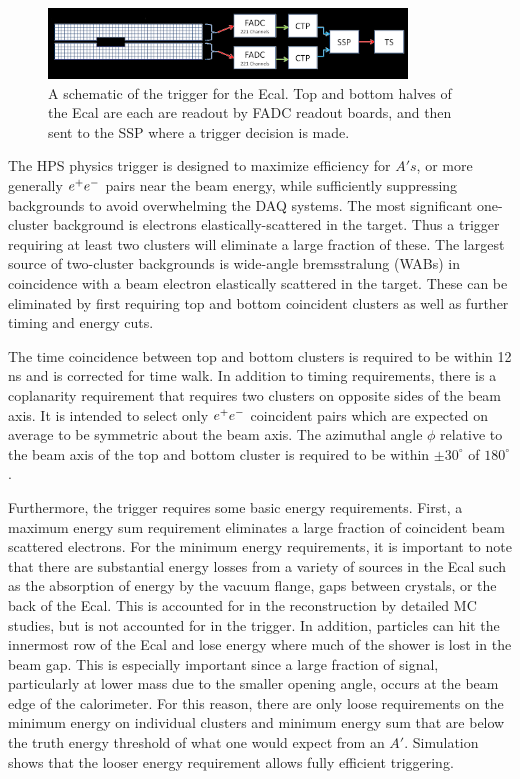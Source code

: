 \begin{figure}
    \centering
    \includegraphics[width=0.85\textwidth]{figs/detector/ecal_trigger.png}
    \caption{A schematic of the trigger for the Ecal. Top and bottom halves of the Ecal are each are readout by FADC readout boards, and then sent to the SSP where a trigger decision is made.}
    \label{fig:ecaltrigger}
\end{figure}

The HPS physics trigger is designed to maximize efficiency for $A's$, or more generally $e^{+}e^{-}$ pairs near the beam energy, while sufficiently suppressing backgrounds to avoid overwhelming the DAQ systems. The most significant one-cluster background is electrons elastically-scattered in the target. Thus a trigger requiring at least two clusters will eliminate a large fraction of these. The largest source of two-cluster backgrounds is wide-angle bremsstralung (WABs) in coincidence with a beam electron elastically scattered in the target. These can be eliminated by first requiring top and bottom coincident clusters as well as further timing and energy cuts.

The time coincidence between top and bottom clusters is required to be within 12 ns and is corrected for time walk. In addition to timing requirements, there is a coplanarity requirement that requires two clusters on opposite sides of the beam axis. It is intended to select only $e^{+}e^{-}$ coincident pairs which are expected on average to be symmetric about the beam axis. The azimuthal angle $\phi$ relative to the beam axis of the top and bottom cluster is required to be within $\pm 30^{\circ}$ of $180^{\circ}$.

Furthermore, the trigger requires some basic energy requirements. First, a maximum energy sum requirement eliminates a large fraction of coincident beam scattered electrons. For the minimum energy requirements, it is important to note that there are substantial energy losses from a variety of sources in the Ecal such as the absorption of energy by the vacuum flange, gaps between crystals, or the back of the Ecal. This is accounted for in the reconstruction by detailed MC studies, but is not accounted for in the trigger. In addition, particles can hit the innermost row of the Ecal and lose energy where much of the shower is lost in the beam gap. This is especially important since a large fraction of signal, particularly at lower mass due to the smaller opening angle, occurs at the beam edge of the calorimeter. For this reason, there are only loose requirements on the minimum energy on individual clusters and minimum energy sum that are below the truth energy threshold of what one would expect from an $A'$. Simulation shows that the looser energy requirement allows fully efficient triggering.

